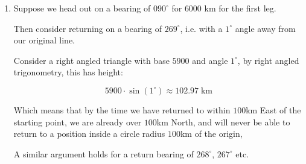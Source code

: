 \documentclass{article}
\begin{document}
\begin{enumerate}
   \item Suppose we head out on a bearing of $090^\circ$ for $6000$ km for the first leg. 

   Then consider returning on a bearing of $269^\circ$, i.e. with a $1^\circ$ angle away from our original line.

   Consider a right angled triangle with base $5900$ and angle $1^\circ$, by right angled trigonometry, this has height:
   
   $$
   5900 \cdot \sin(1^\circ) \approx 102.97 \; \text{km}
   $$

   
   Which means that by the time we have returned to within $100$km East of the starting point, we are already over $100$km North, and will never be able to return to a position inside a circle radius $100$km of the origin,

   A similar argument holds for a return bearing of $268^\circ$, $267^\circ$ etc.


\end{enumerate}
\end{document}
